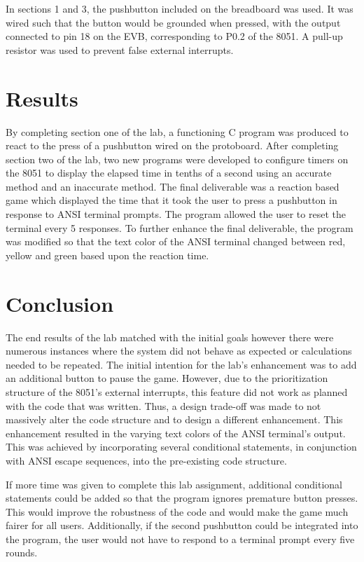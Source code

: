 \documentclass[12pt]{article}
\begin{document}
In sections 1 and 3, the pushbutton included on the breadboard was used. It was wired such that the button would be grounded when pressed, with the output connected to pin 18 on the EVB, corresponding to P0.2 of the 8051. A pull-up resistor was used to prevent false external interrupts.
 
\section{Results}

By completing section one of the lab, a functioning C program was produced to react to the press of a pushbutton wired on the protoboard. After completing section two of the lab, two new programs were developed to configure timers on the 8051 to display the elapsed time in tenths of a second using an accurate method and an inaccurate method. The final deliverable was a reaction based game which displayed the time that it took the user to press a pushbutton in response to ANSI terminal prompts. The program allowed the user to reset the terminal every 5 responses. To further enhance the final deliverable, the program was modified so that the text color of the ANSI terminal changed between red, yellow and green based upon the reaction time. 


\section{Conclusion}

The end results of the lab matched with the initial goals however there were numerous instances where the system did not behave as expected or calculations needed to be repeated. The initial intention for the lab’s enhancement was to add an additional button to pause the game. However, due to the prioritization structure of the 8051’s external interrupts, this feature did not work as planned with the code that was written. Thus, a design trade-off was made to not massively alter the code structure and to design a different enhancement. This enhancement resulted in the varying text colors of the ANSI terminal's output. This was achieved by incorporating several conditional statements, in conjunction with ANSI escape sequences, into the pre-existing code structure. 

If more time was given to complete this lab assignment, additional conditional statements could be added so that the program ignores premature button presses. This would improve the robustness of the code and would make the game much fairer for all users. Additionally, if the second pushbutton could be integrated into the program, the user would not have to respond to a terminal prompt every five rounds. 
\end{document}
